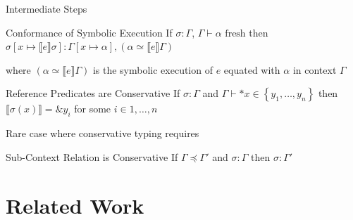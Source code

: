 \documentclass{sdqbeamer}
\newcommand{\set}[1]{\left\{ #1 \right\}}
\newcommand{\bbracket}[1]{\llbracket #1 \rrbracket}
\begin{document}
\begin{frame}[fragile]{Intermediate Steps}
  \begin{greenblock}{Conformance of Symbolic Execution}
    If $\sigma : \Gamma$, $\Gamma \vdash \alpha \text{ fresh}$ then $\sigma[x \mapsto \bbracket{e} \sigma] : \Gamma[x \mapsto \alpha],(\alpha \simeq \bbracket{e} \Gamma)$
  \end{greenblock}
  where $(\alpha \simeq \bbracket{e} \Gamma)$ is the symbolic execution of $e$ equated with $\alpha$ in context $\Gamma$
  
  \begin{greenblock}{Reference Predicates are Conservative}
    If $\sigma : \Gamma $ and $\Gamma \vdash *x \in \set{y_1, \dots, y_n}$ then $\bbracket{\sigma(x)} = \&y_i$ for some $i \in 1, \dots, n$ 
  \end{greenblock}

  Rare case where conservative typing requires 

  \begin{greenblock}{Sub-Context Relation is Conservative}
    If $\Gamma \preceq \Gamma'$ and $\sigma : \Gamma$ then $\sigma : \Gamma'$
  \end{greenblock}

\end{frame}

\section{Related Work}
\end{document}
